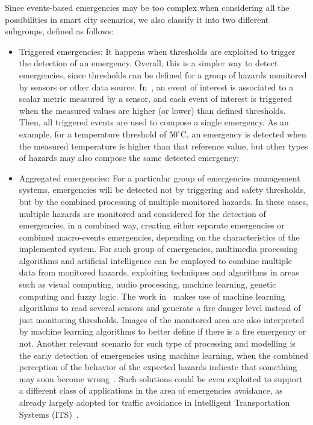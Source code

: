 \begin{refsection}
Since events-based emergencies may be too complex when considering all the possibilities in smart city scenarios, we also classify it into two different subgroups, defined as follows:

\begin{itemize}
  \item Triggered emergencies: It happens when thresholds are exploited to trigger the detection of an emergency. Overall, this is a simpler way to detect emergencies, since thresholds can be defined for a group of hazards monitored by sensors or other data source. In~\cite{emergenciesmetric2}, an event of interest is associated to a scalar metric measured by a sensor, and each event of interest is triggered when the measured values are higher (or lower) than defined thresholds. Then, all triggered events are used to compose a single emergency. As an example, for a temperature threshold of $50^{\circ}$C, an emergency is detected when the measured temperature is higher than that reference value, but other types of hazards may also compose the same detected emergency;
  
  \item Aggregated emergencies: For a particular group of emergencies management systems, emergencies will be detected not by triggering and safety thresholds, but by the combined processing of multiple monitored hazards. In these cases, multiple hazards are monitored and considered for the detection of emergencies, in a combined way, creating either separate emergencies or combined macro-events emergencies, depending on the characteristics of the implemented system. For such group of emergencies, multimedia processing algorithms and artificial intelligence can be employed to combine multiple data from monitored hazards, exploiting techniques and algorithms in areas such as visual computing, audio processing, machine learning, genetic computing and fuzzy logic. The work in~\cite{SultanMahmud2017} makes use of machine learning algorithms to read several sensors and generate a fire danger level instead of just monitoring thresholds. Images of the monitored area are also interpreted by machine learning algorithms to better define if there is a fire emergency or not. Another relevant scenario for such type of processing and modelling is the early detection of emergencies using machine learning, when the combined perception of the behavior of the expected hazards indicate that something may soon become wrong~\cite{machine1}. Such solutions could be even exploited to support a different class of applications in the area of emergencies avoidance, as already largely adopted for traffic avoidance in Intelligent Transportation Systems (ITS)~\cite{machine2}.
\end{itemize}


\end{refsection}
